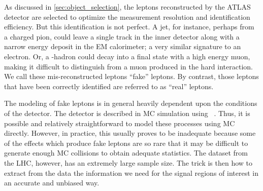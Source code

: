 


As discussed in \sec\ref{sec:object_selection},
the leptons reconstructed by the ATLAS detector are selected
to optimize the measurement resolution and identification efficiency.
But this identification is not perfect. A jet,
for instance, perhaps from a charged pion, could leave a single
track in the inner detector along with a narrow energy deposit in the
EM calorimeter; a very similar signature to an electron. Or, 
a \bee-hadron could decay into a final state with a high energy muon,
making it difficult to distinguish from a muon produced in the hard interaction.
We call these mis-reconstructed leptons ``fake'' leptons. 
By contrast, those leptons that have been correctly identified are 
referred to as ``real'' leptons.


The modeling of fake leptons is in general 
heavily dependent upon the conditions of the detector. 
The detector is described in MC simulation using \geant~\cite{Agostinelli:2002hh}.
Thus, it is possible and relatively straightforward 
to model these processes using MC directly.
However, in practice, this usually proves to be inadequate
because some of the effects which produce fake leptons 
are so rare that it may be difficult to generate enough MC
collisions to obtain adequate statistics.
The dataset from the LHC, however, has an extremely large sample size.
The trick is then how to extract from the data the information we need
for the signal regions of interest in an accurate and unbiased way.


